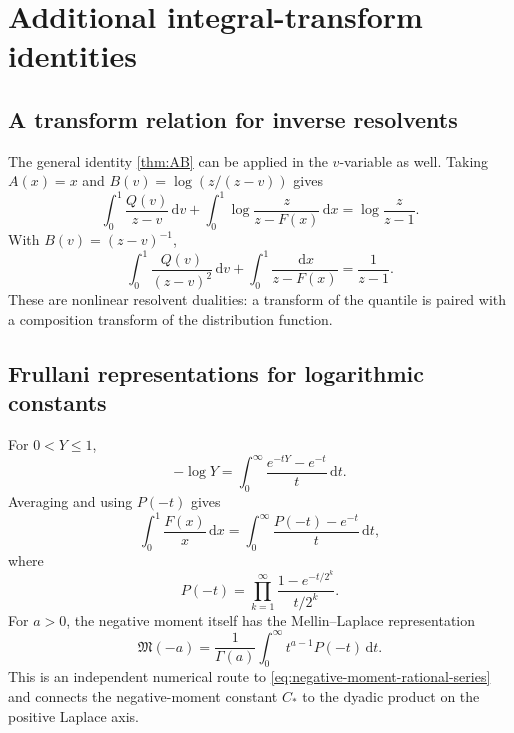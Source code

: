 \documentclass[11pt,oneside]{article}
\theoremstyle{definition}
\newcommand{\F}{F}
\newcommand{\Q}{Q}
\newcommand{\M}{\mathfrak M}
\newcommand{\dd}{\,\mathrm d}
\begin{document}
\section{Additional integral-transform identities}

\subsection{A transform relation for inverse resolvents}

The general identity \cref{thm:AB} can be applied in the \(v\)-variable as well.  Taking
\(A(x)=x\) and
\(B(v)=\log(z/(z-v))\) gives
\begin{equation}\label{eq:inverse-log-resolvent}
 \int_0^1\frac{\Q(v)}{z-v}\dd v
 +\int_0^1\log\frac{z}{z-\F(x)}\dd x
 =\log\frac{z}{z-1}.
\end{equation}
With \(B(v)=(z-v)^{-1}\),
\begin{equation}\label{eq:inverse-square-resolvent}
 \int_0^1\frac{\Q(v)}{(z-v)^2}\dd v
 +\int_0^1\frac{\dd x}{z-\F(x)}
 =\frac1{z-1}.
\end{equation}
These are nonlinear resolvent dualities: a transform of the quantile is paired with a
composition transform of the distribution function.

\subsection{Frullani representations for logarithmic constants}

For \(0<Y\le1\),
\begin{equation}\label{eq:Frullani-log}
 -\log Y=\int_0^\infty\frac{e^{-tY}-e^{-t}}t\dd t.
\end{equation}
Averaging and using \(P(-t)\) gives
\begin{equation}\label{eq:log-Frullani-product}
 \int_0^1\frac{\F(x)}x\dd x
 =\int_0^\infty\frac{P(-t)-e^{-t}}t\dd t,
\end{equation}
where
\begin{equation}\label{eq:Pminus-product}
 P(-t)=\prod_{k=1}^{\infty}
 \frac{1-e^{-t/2^k}}{t/2^k}.
\end{equation}
For \(a>0\), the negative moment itself has the Mellin--Laplace representation
\begin{equation}\label{eq:negative-Mellin-Laplace}
 \M(-a)=\frac1{\Gamma(a)}\int_0^\infty t^{a-1}P(-t)\dd t.
\end{equation}
This is an independent numerical route to \cref{eq:negative-moment-rational-series} and
connects the negative-moment constant \(C_*\) to the dyadic product on the positive
Laplace axis.
\end{document}
